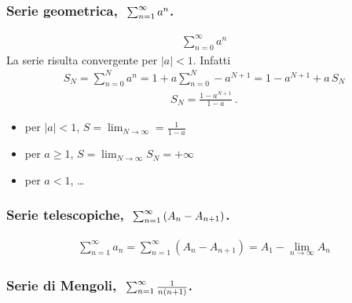 \documentclass[letterpaper,10pt,english]{jupyterBook}
\begin{document}
\subsubsection*{Serie geometrica, \protect\(\ \sum_{n=1}^{\infty} a^n\protect\).}
\begin{equation*}
\begin{split}\sum_{n=0}^{\infty} a^n\end{split}
\end{equation*}
\sphinxAtStartPar
La serie risulta convergente per \(|a|<1\). Infatti
\begin{equation*}
\begin{split}S_N = \sum_{n=0}^{N} a^n = 1 + a \sum_{n=0}^{N} - a^{N+1} = 1 - a^{N+1} + a \, S_N\end{split}
\end{equation*}\begin{equation*}
\begin{split}S_N = \frac{1 - a^{N+1}}{1-a} \ .\end{split}
\end{equation*}\begin{itemize}
\item {} 
\sphinxAtStartPar
per \(|a| < 1\), \(S = \lim_{N \rightarrow \infty} = \frac{1}{1 - a}\)

\item {} 
\sphinxAtStartPar
per \(a \ge 1\), \(S = \lim_{N \rightarrow \infty} S_N = +\infty\)

\item {} 
\sphinxAtStartPar
per \(a<1\), …

\end{itemize}
\subsubsection*{Serie telescopiche, \protect\(\ \sum_{n=1}^{\infty} \left( A_n - A_{n+1} \right)\protect\).}
\begin{equation*}
\begin{split}\sum_{n=1}^{\infty} a_n = \sum_{n=1}^{\infty} \left( A_{n} - A_{n+1} \right) = A_1 - \lim_{n \rightarrow \infty} A_n \end{split}
\end{equation*}\subsubsection*{Serie di Mengoli, \protect\(\ \sum_{n=1}^{\infty} \frac{1}{n(n+1)}\protect\).}
\end{document}
